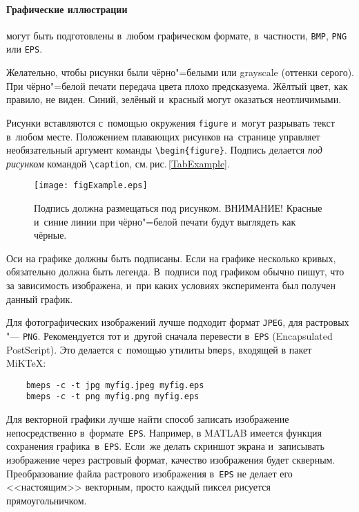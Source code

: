 \paragraph{Графические иллюстрации}
могут быть подготовлены в~любом графическом формате,
в~частности, \verb'BMP', \verb'PNG' или \verb'EPS'.

Желательно, чтобы рисунки были чёрно"=белыми или grayscale (оттенки серого).
При чёрно"=белой печати передача цвета плохо предсказуема.
Жёлтый цвет, как правило, не виден.
Синий, зелёный и~красный могут оказаться неотличимыми.

Рисунки вставляются с~помощью окружения \verb'figure'
и~могут разрывать текст в~любом месте.
Положением плавающих рисунков на~странице
управляет необязательный аргумент команды
\verb'\begin{figure}'.
Подпись делается \emph{под рисунком} командой \verb'\caption',
см.\,рис.\,\ref{TabExample}.

\begin{figure}[t]
    \centering
    \texttt{[image: figExample.eps]}
    \caption{Подпись должна размещаться под рисунком.
        ВНИМАНИЕ! Красные и~синие линии при чёрно"=белой печати будут выглядеть как чёрные.}
    \label{FigExample}
\end{figure}

Оси на графике должны быть подписаны.
Если на графике несколько кривых, обязательно должна быть легенда.
В~подписи под графиком обычно пишут, что за зависимость изображена,
и~при каких условиях эксперимента был получен данный график.

Для фотографических изображений лучше подходит формат \verb'JPEG',
для растровых "--- \verb'PNG'.
Рекомендуется тот и~другой сначала перевести в~\verb'EPS' (Encapsulated PostScript).
Это делается с~помощью утилиты \verb'bmeps', входящей в пакет MiK\TeX:
\begin{verbatim}
    bmeps -c -t jpg myfig.jpeg myfig.eps
    bmeps -c -t png myfig.png myfig.eps
\end{verbatim}

Для векторной графики лучше найти способ записать изображение непосредственно в~формате~\verb'EPS'.
Например, в MATLAB имеется функция сохранения графика~в~\verb'EPS'.
Если~же делать скриншот экрана и~записывать изображение через растровый формат,
качество изображения будет скверным.
Преобразование файла растрового изображения в~\verb'EPS' не делает его <<настоящим>> векторным,
просто каждый пиксел рисуется прямоугольничком.


